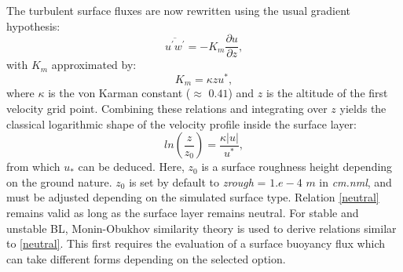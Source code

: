 \documentclass[12pt,A4,french]{article}
\begin{document}
The turbulent surface fluxes are now rewritten using the usual gradient hypothesis:
\begin{equation}
\overline{u^{\prime}w^{\prime}} = -K_{m} \frac{\partial u}{\partial z},
\end{equation}
with $K_{m}$ approximated by:
\begin{equation}
K_{m} = \kappa z u^{*},
\end{equation}
where $\kappa$ is the von Karman constant ($\approx$ $0.41$) and $z$ is the altitude of the first velocity grid point. Combining these relations and integrating over $z$
yields the classical logarithmic shape of the velocity profile inside the surface layer:
\begin{equation}
ln\left(\frac{z}{z_{0}}\right) = \frac{\kappa \left| u \right|}{u^{*}},
\label{neutral}
\end{equation}
from which $u_{*}$ can be deduced. Here, $z_{0}$ is a surface roughness height depending on the ground nature. $z_0$ is set by default to {\it zrough} = $1.e-4$ $m$ in {\it cm.nml}, and must be adjusted  depending on the simulated surface type. Relation \ref{neutral} remains valid as long as the surface layer remains neutral. For stable and unstable BL, Monin-Obukhov similarity theory is used to derive relations similar to \ref{neutral}. This first requires the evaluation of a surface buoyancy flux which can take different forms depending on the selected option.
\end{document}
